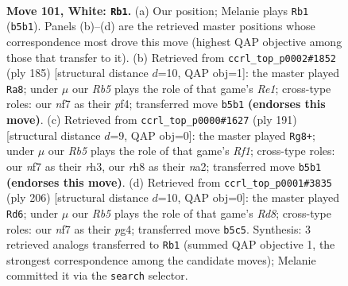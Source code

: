 \documentclass[11pt]{article}
\begin{document}
\clearpage

\begin{figure}[p]\centering
\begin{subfigure}{0.46\textwidth}\centering
\resizebox{\linewidth}{!}{%
\newchessgame
\chessboard[
  setfen={7r/P2k1n2/8/1R6/8/8/4K3/8 w - - 1 101},
  showmover=false,
  pgfstyle=straightmove, color=movearrow, markmove={b5-b1}
]}
\caption{}
\end{subfigure}\hfill
\begin{subfigure}{0.46\textwidth}\centering
\resizebox{\linewidth}{!}{%
\newchessgame
\chessboard[
  setfen={4r3/6k1/8/8/5P2/1K6/p7/7R b - - 1 93},
  showmover=false,
  pgfstyle=straightmove, color=movearrow, markmove={e8-a8}
]}
\caption{}
\end{subfigure}
\\[4pt]
\begin{subfigure}{0.46\textwidth}\centering
\resizebox{\linewidth}{!}{%
\newchessgame
\chessboard[
  setfen={5r2/8/8/6K1/3k4/p6R/N7/8 b - - 2 96},
  showmover=false,
  pgfstyle=straightmove, color=movearrow, markmove={f8-g8}
]}
\caption{}
\end{subfigure}\hfill
\begin{subfigure}{0.46\textwidth}\centering
\resizebox{\linewidth}{!}{%
\newchessgame
\chessboard[
  setfen={3R4/r7/5P2/8/5kp1/8/8/5K2 w - - 6 104},
  showmover=false,
  pgfstyle=straightmove, color=movearrow, markmove={d8-d6}
]}
\caption{}
\end{subfigure}
\caption{\textbf{Move 101, White: \texttt{Rb1}.} (a) Our position; Melanie plays \texttt{Rb1} (\texttt{b5b1}). Panels (b)--(d) are the retrieved master positions whose correspondence most drove this move (highest QAP objective among those that transfer to it). (b) Retrieved from \texttt{ccrl\_top\_p0002\#1852} (ply 185) [structural distance $d$=10, QAP obj=1]: the master played \texttt{Ra8}; under $\mu$ our \emph{Rb5} plays the role of that game's \emph{Re1}; cross-type roles: our \emph{n}f7 as their \emph{p}f4; transferred move \texttt{b5b1} \textbf{(endorses this move)}. (c) Retrieved from \texttt{ccrl\_top\_p0000\#1627} (ply 191) [structural distance $d$=9, QAP obj=0]: the master played \texttt{Rg8+}; under $\mu$ our \emph{Rb5} plays the role of that game's \emph{Rf1}; cross-type roles: our \emph{n}f7 as their \emph{r}h3, our \emph{r}h8 as their \emph{n}a2; transferred move \texttt{b5b1} \textbf{(endorses this move)}. (d) Retrieved from \texttt{ccrl\_top\_p0001\#3835} (ply 206) [structural distance $d$=10, QAP obj=0]: the master played \texttt{Rd6}; under $\mu$ our \emph{Rb5} plays the role of that game's \emph{Rd8}; cross-type roles: our \emph{n}f7 as their \emph{p}g4; transferred move \texttt{b5c5}. Synthesis: 3 retrieved analogs transferred to \texttt{Rb1} (summed QAP objective 1, the strongest correspondence among the candidate moves); Melanie committed it via the \texttt{search} selector.}
\label{fig:thought-m200}
\end{figure}
\end{document}
